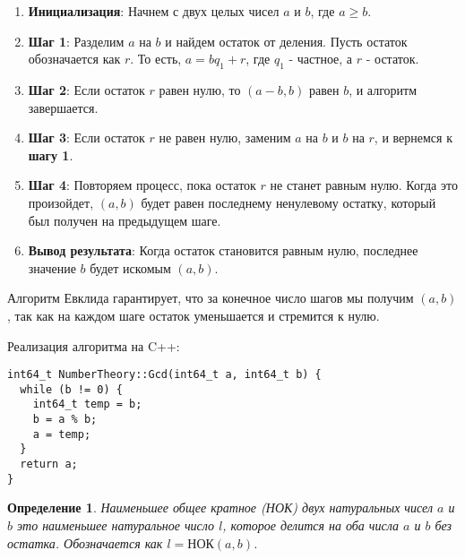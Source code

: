 \documentclass[12pt, a4paper, openany]{book}
\newtheorem*{definition}{Определение}
\begin{document}
\begin{enumerate}
  \item \textbf{Инициализация}: Начнем с двух целых чисел $a$ и $b$, где $a \geq b$.
  
  \item \textbf{Шаг 1}: Разделим $a$ на $b$ и найдем остаток от деления. Пусть остаток обозначается как $r$. То есть, $a = bq_1 + r$, где $q_1$ - частное, а $r$ - остаток.
  
  \item \textbf{Шаг 2}: Если остаток $r$ равен нулю, то $(a-b, b)$ равен $b$, и алгоритм завершается.
  
  \item \textbf{Шаг 3}: Если остаток $r$ не равен нулю, заменим $a$ на $b$ и $b$ на $r$, и вернемся к \textbf{шагу 1}.
  
  \item \textbf{Шаг 4}: Повторяем процесс, пока остаток $r$ не станет равным нулю. Когда это произойдет, $(a, b)$ будет равен последнему ненулевому остатку, который был получен на предыдущем шаге.
  
  \item \textbf{Вывод результата}: Когда остаток становится равным нулю, последнее значение $b$ будет искомым $(a, b)$.
\end{enumerate}

Алгоритм Евклида гарантирует, что за конечное число шагов мы получим $(a, b)$, так как на каждом шаге остаток уменьшается и стремится к нулю.

\newpage

\noindent
Реализация алгоритма на C++:

\begin{lstlisting}
int64_t NumberTheory::Gcd(int64_t a, int64_t b) {
  while (b != 0) {
    int64_t temp = b;
    b = a % b;
    a = temp;
  }
  return a;
}
\end{lstlisting}

\begin{definition}
Наименьшее общее кратное (НОК) двух натуральных чисел \(a\) и \(b\) это наименьшее натуральное число \(l\), которое делится на оба числа \(a\) и \(b\) без остатка. Обозначается как \(l = \text{НОК}(a, b)\).
\end{definition}
\end{document}
